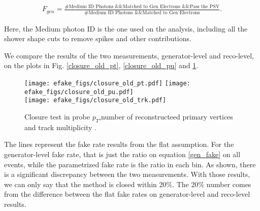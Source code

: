 \begin{eqnarray}
F_{gen} = \frac{\textrm{\#Medium ID Photons \&\& Matched to Gen Electrons \&\& Pass the PSV}}{\textrm{\#Medium ID Photons \&\& Matched to Gen Electrons}}. \label{gen_fake}
\end{eqnarray}

Here, the Medium photon ID is the one used on the analysis, including all the shower shape cuts to remove spikes and other contributions.

We compare the results of the two measurements, generator-level and reco-level, on the plots in Fig. \ref{closure_old_pt}, \ref{closure_old_pu} and \ref{closure_old_ntrk}.

\begin{figure}[h]
\begin{center}
{\label{closure_old_pt}\texttt{[image: efake\_figs/closure\_old\_pt.pdf]}}
{\label{closure_old_pu}\texttt{[image: efake\_figs/closure\_old\_pu.pdf]}}
\\
{\label{closure_old_ntrk}\texttt{[image: efake\_figs/closure\_old\_trk.pdf]}}
\caption{Closure test in probe $p_T$,number of reconstructeed primary vertices and track multiplicity .}
\end{center}
\end{figure}
%


The lines represent the fake rate results from the flat assumption. For the generator-level fake rate, that is just the ratio on equation \ref{gen_fake} on all events, while the parametrized fake rate is the ratio in each bin. As shown, there is a significant discrepancy between the two measurements. With those results, we can only say that the method is closed within 20\%. The 20\% number comes from the difference between the flat fake rates on generator-level and reco-level results.

